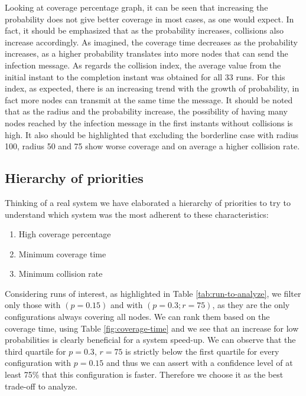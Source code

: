 \noindent Looking at coverage percentage graph, it can be seen that increasing the probability does not give better coverage in most cases, as one would expect. In fact, it should be emphasized that as the probability increases, collisions also increase accordingly. As imagined, the coverage time decreases as the probability increases, as a higher probability translates into more nodes that can send the infection message. As regards the collision index, the average value from the initial instant to the completion instant was obtained for all 33 runs. For this index, as expected, there is an increasing trend with the growth of probability, in fact more nodes can transmit at the same time the message. It should be noted that as the radius and the probability increase, the possibility of having many nodes reached by the infection message in the first instants without collisions is high. It also should be highlighted that excluding the borderline case with radius 100, radius 50 and 75 show worse coverage and on average a higher collision rate. 

\clearpage 

\subsection{Hierarchy of priorities}
Thinking of a real system we have elaborated a hierarchy of priorities to try to understand which system was the most adherent to these characteristics:

\begin{enumerate}
\item High coverage percentage
\item Minimum coverage time
\item Minimum collision rate
\end{enumerate}

Considering runs of interest, as highlighted in Table \ref{tab:run-to-analyze}, we filter only those with $(p=0.15)$ and with $(p=0.3;r=75)$, as they are the only configurations always covering all nodes.
We can rank them based on the coverage time, using Table \ref{fig:coverage-time} and we see that an increase for low probabilities is clearly beneficial for a system speed-up. We can observe that the third quartile for $p=0.3$, $r=75$ is strictly below the first quartile for every configuration with $p=0.15$ and thus we can assert with a confidence level of at least 75\% that this configuration is faster. Therefore we choose it as the best trade-off to analyze.

